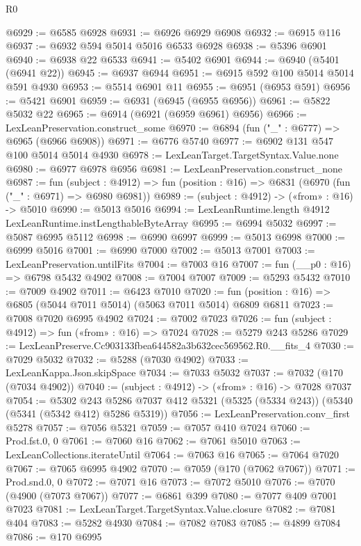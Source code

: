 \begin{lexlean}{R0}
\begin{coremodule}
@6929 := @6585 @6928
@6931 := @6926 @6929 @6908
@6932 := @6915 @116
@6937 := @6932 @594 @5014 @5016 @6533 @6928
@6938 := @5396 @6901
@6940 := @6938 @22 @6533
@6941 := @5402 @6901
@6944 := @6940 (@5401 (@6941 @22))
@6945 := @6937 @6944
@6951 := @6915 @592 @100 @5014 @5014 @591 @4930
@6953 := @5514 @6901 @11
@6955 := @6951 (@6953 @591)
@6956 := @5421 @6901
@6959 := @6931 (@6945 (@6955 @6956))
@6961 := @5822 @5032 @22
@6965 := @6914 (@6921 (@6959 @6961) @6956)
@6966 := LexLeanPreservation.construct_some
@6970 := @6894 (fun ("_" : @6777) => @6965 (@6966 @6908))
@6971 := @6776 @5740
@6977 := @6902 @131 @547 @100 @5014 @5014 @4930
@6978 := LexLeanTarget.TargetSyntax.Value.none
@6980 := @6977 @6978 @6956
@6981 := LexLeanPreservation.construct_none
@6987 := fun (subject : @4912) =>
  fun (position : @16) => @6831 (@6970 (fun ("_" : @6971) => @6980 @6981))
@6989 := (subject : @4912) -> («from» : @16) -> @5010
@6990 := @5013 @5016
@6994 := LexLeanRuntime.length @4912 LexLeanRuntime.instLengthableByteArray
@6995 := @6994 @5032
@6997 := @5087 @6995 @5112
@6998 := @6990 @6997
@6999 := @5013 @6998
@7000 := @6999 @5016
@7001 := @6990 @7000
@7002 := @5013 @7001
@7003 := LexLeanPreservation.untilFits
@7004 := @7003 @16
@7007 := fun (__p0 : @16) => @6798 @5432 @4902
@7008 := @7004 @7007
@7009 := @5293 @5432
@7010 := @7009 @4902
@7011 := @6423 @7010
@7020 := fun (position : @16) => @6805 (@5044 @7011 @5014) (@5063 @7011 @5014) @6809 @6811
@7023 := @7008 @7020 @6995 @4902
@7024 := @7002 @7023
@7026 := fun (subject : @4912) => fun («from» : @16) => @7024
@7028 := @5279 @243 @5286
@7029 := LexLeanPreserve.Cc903133fbea644582a3b632cec569562.R0.__fits_4
@7030 := @7029 @5032
@7032 := @5288 (@7030 @4902)
@7033 := LexLeanKappa.Json.skipSpace
@7034 := @7033 @5032
@7037 := @7032 (@170 (@7034 @4902))
@7040 := (subject : @4912) -> («from» : @16) -> @7028 @7037
@7054 := @5302
    @243
    @5286
    @7037
    @412
    @5321
    (@5325 (@5334 @243))
    (@5340 (@5341 (@5342 @412) @5286 @5319))
@7056 := LexLeanPreservation.conv_first @5278
@7057 := @7056 @5321
@7059 := @7057 @410 @7024
@7060 := Prod.fst.{0, 0}
@7061 := @7060 @16
@7062 := @7061 @5010
@7063 := LexLeanCollections.iterateUntil
@7064 := @7063 @16
@7065 := @7064 @7020
@7067 := @7065 @6995 @4902
@7070 := @7059 (@170 (@7062 @7067))
@7071 := Prod.snd.{0, 0}
@7072 := @7071 @16
@7073 := @7072 @5010
@7076 := @7070 (@4900 (@7073 @7067))
@7077 := @6861 @399
@7080 := @7077 @409 @7001 @7023
@7081 := LexLeanTarget.TargetSyntax.Value.closure
@7082 := @7081 @404
@7083 := @5282 @4930
@7084 := @7082 @7083
@7085 := @4899 @7084
@7086 := @170 @6995

\end{coremodule}
\end{lexlean}
